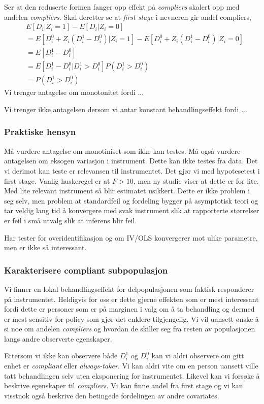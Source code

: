 Ser at den reduserte formen fanger opp effekt på \textit{compliers} skalert opp med andelen \textit{compliers}. Skal deretter se at \textit{first stage} i nevneren gir andel compliers,
\begin{align}
&E[D_i|Z_i=1]-E[D_i|Z_i=0] \\
&= E[D_i^0+Z_i(D_i^1-D_i^0)|Z_i=1] - E[D_i^0+Z_i(D_i^1-D_i^0)|Z_i=0] \\
&= E[D_i^1-D_i^0] \\
&= E[D_i^1-D_i^0|D_i^1>D_i^0]P(D_i^1>D_i^0) \\
& = P(D_i^1>D_i^0)
\end{align}
Vi trenger antagelse om monotonitet fordi ...

Vi trenger ikke antagelsen dersom vi antar konstant behandlingseffekt fordi ...
\subsubsection{Praktiske hensyn}
Må vurdere antagelse om monotiniset som ikke kan testes. Må også vurdere antagelsen om eksogen variasjon i instrument. Dette kan ikke testes fra data. Det vi derimot kan teste er relevansen til instrumentet. Det gjør vi med hypotesetest i first stage. Vanlig huskeregel er at $F>10$, men ny studie viser at dette er for lite. Med lite relevant instrument så blir estimatet usikkert. Dette er ikke problem i seg selv, men problem at standardfeil og fordeling bygger på asymptotisk teori og tar veldig lang tid å konvergere med svak instrument slik at rapporterte størrelser er feil i små utvalg slik at inferens blir feil.

Har tester for overidentifikasjon og om IV/OLS konvergerer mot ulike parametre, men er ikke så interessant.
\subsubsection{Karakterisere compliant subpopulasjon}
Vi finner en lokal behandlingseffekt for delpopulasjonen som faktisk responderer på instrumentet. Heldigvis for oss er dette gjerne effekten som er mest interessant fordi dette er personer som er på marginen i valg om å ta behandling og dermed er mest sensitiv for policy som gjør det enklere tilgjengelig. Vi vil uansett ønske å si noe om andelen \textit{compliers} og hvordan de skiller seg fra resten av populasjonen langs andre observerte egenskaper.

Ettersom vi ikke kan observere både $D_i^1$ og $D_i^0$ kan vi aldri observere om gitt enhet er \textit{compliant} eller \textit{always-taker}. Vi kan aldri vite om en person uansett ville tatt behandlingen selv uten eksponering for instrumentet. Likevel kan vi forsøke å beskrive egenskaper til \textit{compliers}. Vi kan finne andel fra first stage og vi kan visstnok også beskrive den betingede fordelingen av andre covariates.
